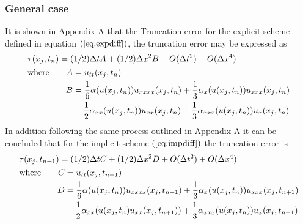 \documentclass[11pt]{article}
\newcommand{\D}{\Delta}
\newcommand{\al}{\mathrm{\alpha}}
\begin{document}
\subsubsection{General case}
It is shown in Appendix A that the Truncation error for the explicit scheme defined in equation $(\ref{eq:expdiff})$, the truncation error may be expressed as
\begin{equation}
\label{eq:exptru}
\begin{split}
&\tau(x_j,t_n) = (1/2)\D{t}A + (1/2)\D{x^2}B + O(\D{t^2}) + O(\D{x^4})\\ 
&\begin{aligned}
\text{where\qquad}
A &= u_{tt}(x_j,t_n)\\
B &= \frac{ 1 }{6 }\al(u(x_j,t_n))u_{xxxx}(x_j,t_n)+ \frac{1}{3} \al_x(u(x_j,t_n ))u_{xxx}(x_j,t_n ) \\ &+\frac{1}{2}\al_{xx}(u(x_j,t_n))u_{xx}(x_j,t_n) +\frac{1}{3}\al_{xxx}(u(x_j,t_n))u_{x}(x_j,t_n)
\end{aligned}
\end{split}
\end{equation}
In addition following the same process outlined in Appendix A it can be concluded that for the implicit scheme $(\ref{eq:impdiff})$ the truncation error is
\begin{equation}
\label{eq:imptru}
    \begin{split}
        &\tau(x_j,t_{n+1}) = (1/2)\D{t}C + (1/2)\D{x^2}D  +  O(\D{t^2}) + O(\D{x^4})\\ 
        &\begin{aligned}
            \text{where\qquad}
            C &=  u_{tt}(x_j,t_{n+1})\\
            D &= \frac{ 1 }{6 }\al(u(x_j,t_n))u_{xxxx}(x_j,t_{n+1})+ \frac{1}{3} \al_x(u(x_j,t_{n} ))u_{xxx}(x_j,t_{n+1} ) \\ &+\frac{1}{2}\al_{xx}(u(x_j,t_{n})u_{xx}(x_j,t_{n+1})) +\frac{1}{3}\al_{xxx}(u(x_j,t_n))u_{x}(x_j,t_{n+1})
        \end{aligned}
    \end{split}
\end{equation}
%
%
\end{document}
